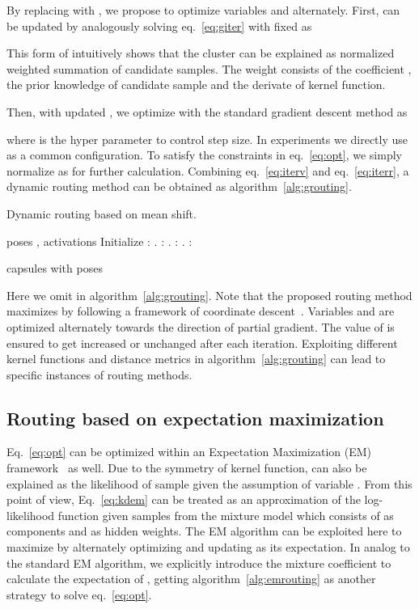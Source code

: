 \documentclass[runningheads]{llncs}
\begin{document}
By replacing  with , we propose to optimize variables  and  alternately. First,  can be updated by analogously solving eq.~\ref{eq:giter} with fixed  as



This form of  intuitively shows that the cluster can be explained as normalized weighted summation of candidate samples. The weight consists of the coefficient , the prior knowledge of candidate sample and the derivate of kernel function. 

Then, with updated , we optimize  with the standard gradient descent method as

where  is the hyper parameter to control step size. In experiments we directly use  as a common configuration. To satisfy the constraints in eq.~\ref{eq:opt}, we simply normalize  as  for further calculation. Combining eq.~\ref{eq:iterv} and eq.~\ref{eq:iterr}, a dynamic routing method can be obtained as algorithm~\ref{alg:grouting}.
\begin{algorithm}
  \caption{Dynamic routing based on mean shift.}
  \label{alg:grouting}
  \begin{algorithmic}
   \REQUIRE poses , activations 
   \STATE Initialize : 
   . : 
   . : 
   . : 

   \ENDFOR
   \RETURN capsules with poses 
  \end{algorithmic}
\end{algorithm}

Here we omit  in algorithm~\ref{alg:grouting}. Note that the proposed routing method maximizes  by following a framework of coordinate descent~\cite{wright2015coordinate}. Variables  and  are optimized alternately towards the direction of partial gradient. The value of  is ensured to get increased or unchanged after each iteration. Exploiting different kernel functions and distance metrics in algorithm~\ref{alg:grouting} can lead to specific instances of routing methods.

\subsection{Routing based on expectation maximization}
Eq.~\ref{eq:opt} can be optimized within an Expectation Maximization (EM) framework~\cite{dempster1977maximum} as well. Due to the symmetry of kernel function,  can also be explained as the likelihood of sample  given the assumption of variable . From this point of view, Eq.~\ref{eq:kdem} can be treated as an approximation of the log-likelihood function given samples from the mixture model which consists of  as components and  as hidden weights. The EM algorithm can be exploited here to maximize  by alternately optimizing  and updating  as its expectation. In analog to the standard EM algorithm, we explicitly introduce the mixture coefficient  to calculate the expectation of , getting algorithm~\ref{alg:emrouting} as another strategy to solve eq.~\ref{eq:opt}.
\end{document}

